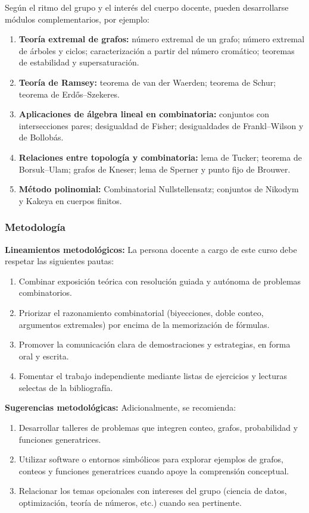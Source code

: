 \begin{refsection}
Según el ritmo del grupo y el interés del cuerpo docente, pueden desarrollarse módulos complementarios, por ejemplo:
\begin{enumerate}
\item \textbf{Teoría extremal de grafos:} número extremal de un grafo; número extremal de árboles y ciclos; caracterización a partir del número cromático; teoremas de estabilidad y supersaturación.
\item \textbf{Teoría de Ramsey:} teorema de van der Waerden; teorema de Schur; teorema de Erd\H{o}s--Szekeres.
\item \textbf{Aplicaciones de álgebra lineal en combinatoria:} conjuntos con intersecciones pares; desigualdad de Fisher; desigualdades de Frankl--Wilson y de Bollobás.
\item \textbf{Relaciones entre topología y combinatoria:} lema de Tucker; teorema de Borsuk--Ulam; grafos de Kneser; lema de Sperner y punto fijo de Brouwer.
\item \textbf{Método polinomial:} Combinatorial Nullstellensatz; conjuntos de Nikodym y Kakeya en cuerpos finitos.
\end{enumerate}

\subsubsection*{Metodología}

\noindent\textbf{Lineamientos metodológicos:} La persona docente a cargo de este curso debe respetar las siguientes pautas:
\begin{enumerate}
    \item Combinar exposición teórica con resolución guiada y autónoma de problemas combinatorios.
    \item Priorizar el razonamiento combinatorial (biyecciones, doble conteo, argumentos extremales) por encima de la memorización de fórmulas.
    \item Promover la comunicación clara de demostraciones y estrategias, en forma oral y escrita.
    \item Fomentar el trabajo independiente mediante listas de ejercicios y lecturas selectas de la bibliografía.
\end{enumerate}

\textbf{Sugerencias metodológicas:} Adicionalmente, se recomienda:
\begin{enumerate}
    \item Desarrollar talleres de problemas que integren conteo, grafos, probabilidad y funciones generatrices.
    \item Utilizar software o entornos simbólicos para explorar ejemplos de grafos, conteos y funciones generatrices cuando apoye la comprensión conceptual.
    \item Relacionar los temas opcionales con intereses del grupo (ciencia de datos, optimización, teoría de números, etc.) cuando sea pertinente.
\end{enumerate}


\end{refsection}

